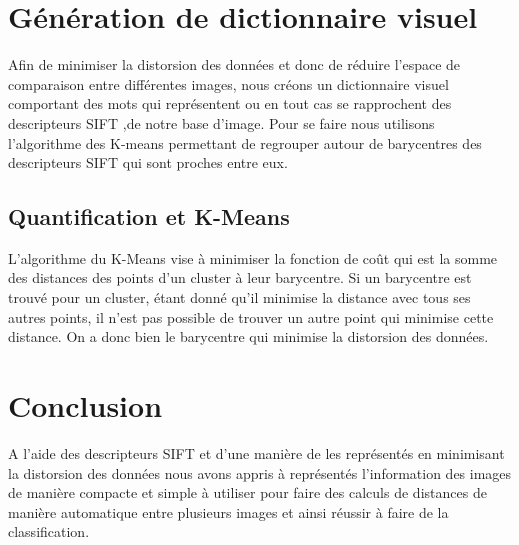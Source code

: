 \documentclass[a4paper]{article}
\begin{document}
\section{Génération de dictionnaire visuel}
Afin de minimiser la distorsion des données et donc de réduire l'espace de comparaison entre différentes images, nous créons un dictionnaire visuel comportant des mots qui représentent ou en tout cas se rapprochent des descripteurs SIFT ,de notre base d'image. Pour se faire nous utilisons l'algorithme des K-means permettant de regrouper autour de barycentres des descripteurs SIFT qui sont proches entre eux.

\subsection{Quantification et K-Means}
L'algorithme du K-Means vise à minimiser la fonction de coût qui est la somme des distances des points d'un cluster à leur barycentre. Si un barycentre est trouvé pour un cluster, étant donné qu'il minimise la distance avec tous ses autres points, il n'est pas possible de trouver un autre point qui minimise cette distance. On a donc bien le barycentre qui minimise la distorsion des données.

\section{Conclusion}
A l'aide des descripteurs SIFT et d'une manière de les représentés en minimisant la distorsion des données nous avons appris à représentés l'information des images de manière compacte et simple à utiliser pour faire des calculs de distances de manière automatique entre plusieurs images et ainsi réussir à faire de la classification.
\end{document}
